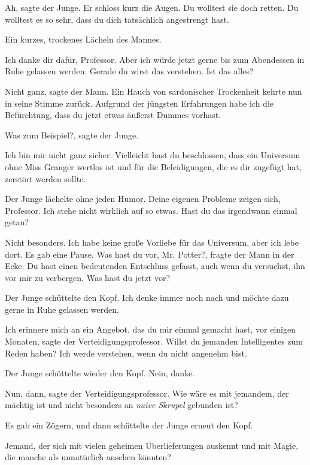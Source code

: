 \glqq Ah\grqq{}, sagte der Junge. Er schloss kurz die Augen. \glqq Du wolltest
sie doch retten. Du wolltest es so sehr, dass du dich tatsächlich angestrengt
hast.\grqq{}

Ein kurzes, trockenes Lächeln des Mannes.

\glqq Ich danke dir dafür, Professor. Aber ich würde jetzt gerne bis zum
Abendessen in Ruhe gelassen werden. Gerade du wirst das verstehen. Ist das
alles?\grqq{}

\glqq Nicht ganz\grqq{}, sagte der Mann. Ein Hauch von sardonischer Trockenheit
kehrte nun in seine Stimme zurück. \glqq Aufgrund der jüngsten Erfahrungen habe
ich die Befürchtung, dass du jetzt etwas äußerst Dummes vorhast.\grqq{}

\glqq Was zum Beispiel?\grqq{}, sagte der Junge.

\glqq Ich bin mir nicht ganz sicher. Vielleicht hast du beschlossen, dass ein
Universum ohne Miss Granger wertlos ist und für die Beleidigungen, die es dir
zugefügt hat, zerstört werden sollte.\grqq{}

Der Junge lächelte ohne jeden Humor. \glqq Deine eigenen Probleme zeigen sich,
Professor. Ich stehe nicht wirklich auf so etwas. Hast du das irgendwann einmal
getan?\grqq{}

\glqq Nicht besonders. Ich habe keine große Vorliebe für das Universum, aber ich
lebe dort.\grqq{} Es gab eine Pause. \glqq Was hast du vor, Mr. Potter?\grqq{},
fragte der Mann in der Ecke. \glqq Du hast einen bedeutenden Entschluss gefasst,
auch wenn du versuchst, ihn vor mir zu verbergen. Was hast du jetzt vor?\grqq{}

Der Junge schüttelte den Kopf. \glqq Ich denke immer noch nach und möchte dazu
gerne in Ruhe gelassen werden.\grqq{}

\glqq Ich erinnere mich an ein Angebot, das du mir einmal gemacht hast, vor
einigen Monaten\grqq{}, sagte der Verteidigungsprofessor. \glqq Willst du
jemanden Intelligentes zum Reden haben? Ich werde verstehen, wenn du nicht
angenehm bist.\grqq{}

Der Junge schüttelte wieder den Kopf. \glqq Nein, danke.\grqq{}

\glqq Nun, dann\grqq{}, sagte der Verteidigungsprofessor. \glqq Wie wäre es mit
jemandem, der mächtig ist und nicht besonders an\emph{ naive Skrupel} gebunden
ist?\grqq{}

Es gab ein Zögern, und dann schüttelte der Junge erneut den Kopf.

\glqq Jemand, der sich mit vielen geheimen Überlieferungen auskennt und mit
Magie, die manche als unnatürlich ansehen könnten?\grqq{}

